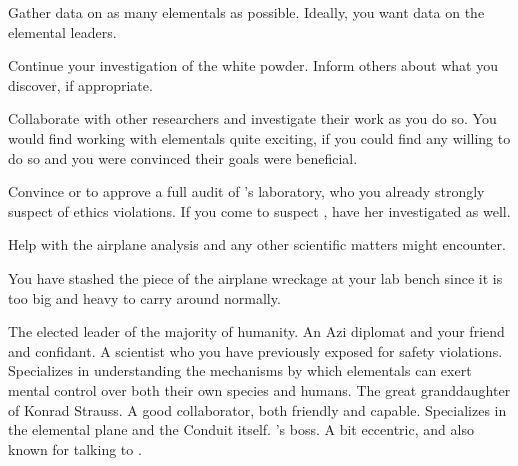 \documentclass[char]{elementals}
\begin{document}
\begin{itemz}[Goals]
  \item Gather data on as many elementals as possible. Ideally, you want data on the elemental leaders.
  \item Continue your investigation of the white powder. Inform others about what you discover, if appropriate.
  \item Collaborate with other researchers and investigate their work as you do so. You would find working with elementals quite exciting, if you could find any willing to do so and you were convinced their goals were beneficial.
  \item Convince \cLeader{} or \cDema{} to approve a full audit of \cMS{}'s laboratory, who you already strongly suspect of ethics violations. If you come to suspect \cGD{}, have her investigated as well.
  \item Help \cDiplomat{} with the airplane analysis and any other scientific matters \cDiplomat{\they} might encounter.
\end{itemz}

\begin{itemz}[Notes]
\item You have stashed the piece of the airplane wreckage at your lab bench since it is too big and heavy to carry around normally.
\end{itemz}

\begin{contacts}
  \contact{\cLeader{}} The elected leader of the majority of humanity.
	\contact{\cDiplomat{}} An Azi diplomat and your friend and confidant.
	\contact{\cMS{}} A scientist who you have previously exposed for safety violations. Specializes in understanding the mechanisms by which elementals can exert mental control over both their own species and humans.
	\contact{\cGD{}} The great granddaughter of Konrad Strauss. A good collaborator, both friendly and capable. Specializes in the elemental plane and the Conduit itself.
  \contact{\cAvatar{}} \cDiplomat{}'s boss. A bit eccentric, and also known for talking to \cAvatar{\themself}.
\end{contacts}
\end{document}
